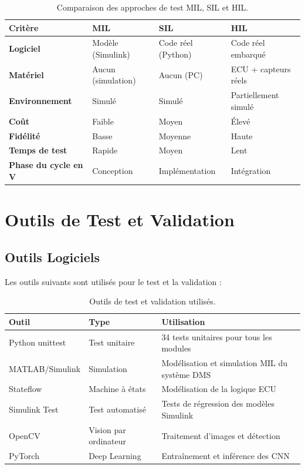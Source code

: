 \begin{table}[H]
\centering
\caption{Comparaison des approches de test MIL, SIL et HIL.}
\label{tab:mil_sil_hil}
\renewcommand{\arraystretch}{1.4}
\begin{tabularx}{\textwidth}{|>{\bfseries}l|X|X|X|}
\hline
\rowcolor{stellantisblue!15}
\textbf{Critère} & \textbf{MIL} & \textbf{SIL} & \textbf{HIL} \\
\hline
Logiciel & Modèle (Simulink) & Code réel (Python) & Code réel embarqué \\
\hline
Matériel & Aucun (simulation) & Aucun (PC) & ECU + capteurs réels \\
\hline
Environnement & Simulé & Simulé & Partiellement simulé \\
\hline
Coût & Faible & Moyen & Élevé \\
\hline
Fidélité & Basse & Moyenne & Haute \\
\hline
Temps de test & Rapide & Moyen & Lent \\
\hline
Phase du cycle en V & Conception & Implémentation & Intégration \\
\hline
\end{tabularx}
\end{table}

\section{Outils de Test et Validation}

\subsection{Outils Logiciels}

Les outils suivants sont utilisés pour le test et la validation :

\begin{table}[H]
\centering
\caption{Outils de test et validation utilisés.}
\label{tab:outils_test}
\renewcommand{\arraystretch}{1.3}
\begin{tabularx}{\textwidth}{|l|l|X|}
\hline
\rowcolor{stellantisblue!15}
\textbf{Outil} & \textbf{Type} & \textbf{Utilisation} \\
\hline
Python unittest & Test unitaire & 34 tests unitaires pour tous les modules \\
\hline
MATLAB/Simulink & Simulation & Modélisation et simulation MIL du système DMS \\
\hline
Stateflow & Machine à états & Modélisation de la logique ECU \\
\hline
Simulink Test & Test automatisé & Tests de régression des modèles Simulink \\
\hline
OpenCV & Vision par ordinateur & Traitement d'images et détection \\
\hline
PyTorch & Deep Learning & Entraînement et inférence des CNN \\
\hline
\end{tabularx}
\end{table}

